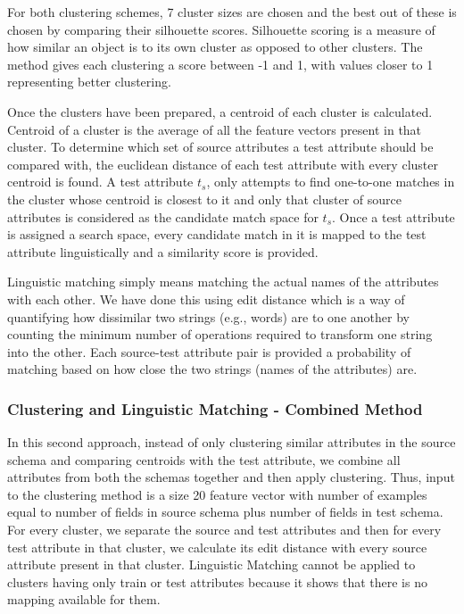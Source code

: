 \documentclass[conference]{IEEEtran}
\begin{document}
For both clustering schemes, 7 cluster sizes are chosen and the best out of these is chosen by comparing their silhouette scores. Silhouette scoring is a measure of how similar an object is to its own cluster as opposed to other clusters. The method gives each clustering a score between -1 and 1, with values closer to 1 representing better clustering.


Once the clusters have been prepared, a centroid of each cluster is calculated. Centroid of a cluster is the average of all the feature vectors present in that cluster. To determine which set of source attributes a test attribute should be compared with, the euclidean distance of each test attribute with every cluster centroid is found. A test attribute $t_s$, only attempts to find one-to-one matches in the cluster whose centroid is closest to it and only that cluster of source attributes is considered as the candidate match space for $t_s$. Once a test attribute is assigned a search space, every candidate match in it is mapped to the test attribute linguistically and a similarity score is provided. 

Linguistic matching simply means matching the actual names of the attributes with each other. We have done this using edit distance which is a way of quantifying how dissimilar two strings (e.g., words) are to one another by counting the minimum number of operations required to transform one string into the other. Each source-test attribute pair is provided a probability of matching based on how close the two strings (names of the attributes) are.

\subsubsection*{\textbf{Clustering and Linguistic Matching - Combined Method}}
In this second approach, instead of only clustering similar attributes in the source schema and comparing centroids with the test attribute, we combine all attributes from both the schemas together and then apply clustering. Thus, input to the clustering method is a size 20 feature vector with number of examples equal to number of fields in source schema plus number of fields in test schema. For every cluster, we separate the source and test attributes and then for every test attribute in that cluster, we calculate its edit distance with every source attribute present in that cluster. Linguistic Matching cannot be applied to clusters having only train or test attributes because it shows that there is no mapping available for them. 
\end{document}
